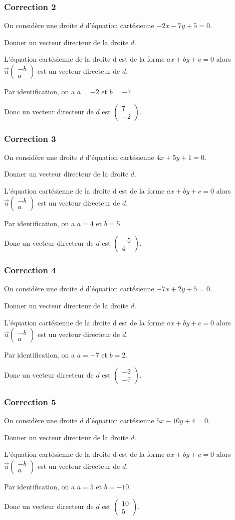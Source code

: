 \documentclass[15pt, mathserif]{beamer}
\newcommand{\vco}[2]{\begin{pmatrix} #1 \\ #2 \end{pmatrix}} %
\begin{document}
\begin{frame}
\vspace{-10mm}
	\frametitle{Correction 2}
 On considère une droite $d$ d'équation cartésienne $-2x-7y+5=0$. 
 
 Donner un vecteur directeur de la droite $d$. 
 
 \bigskip 
 
 L'équation cartésienne de la droite d est de la forme $ax + by + c = 0$ alors $\overrightarrow{u}\vco{-b}{a}$ est un vecteur directeur de $d$. 
 
 Par identification, on a $a=-2$ et $b=-7$. 
 
 Donc un vecteur directeur de $d$ est $\vco{7}{-2}$.\end{frame}


\begin{frame}
\vspace{-10mm}
	\frametitle{Correction 3}
 On considère une droite $d$ d'équation cartésienne $4x+5y+1=0$. 
 
 Donner un vecteur directeur de la droite $d$. 
 
 \bigskip 
 
 L'équation cartésienne de la droite d est de la forme $ax + by + c = 0$ alors $\overrightarrow{u}\vco{-b}{a}$ est un vecteur directeur de $d$. 
 
 Par identification, on a $a=4$ et $b=5$. 
 
 Donc un vecteur directeur de $d$ est $\vco{-5}{4}$.\end{frame}


\begin{frame}
\vspace{-10mm}
	\frametitle{Correction 4}
 On considère une droite $d$ d'équation cartésienne $-7x+2y+5=0$. 
 
 Donner un vecteur directeur de la droite $d$. 
 
 \bigskip 
 
 L'équation cartésienne de la droite d est de la forme $ax + by + c = 0$ alors $\overrightarrow{u}\vco{-b}{a}$ est un vecteur directeur de $d$. 
 
 Par identification, on a $a=-7$ et $b=2$. 
 
 Donc un vecteur directeur de $d$ est $\vco{-2}{-7}$.\end{frame}


\begin{frame}
\vspace{-10mm}
	\frametitle{Correction 5}
 On considère une droite $d$ d'équation cartésienne $5x-10y+4=0$. 
 
 Donner un vecteur directeur de la droite $d$. 
 
 \bigskip 
 
 L'équation cartésienne de la droite d est de la forme $ax + by + c = 0$ alors $\overrightarrow{u}\vco{-b}{a}$ est un vecteur directeur de $d$. 
 
 Par identification, on a $a=5$ et $b=-10$. 
 
 Donc un vecteur directeur de $d$ est $\vco{10}{5}$.\end{frame}
\end{document}
